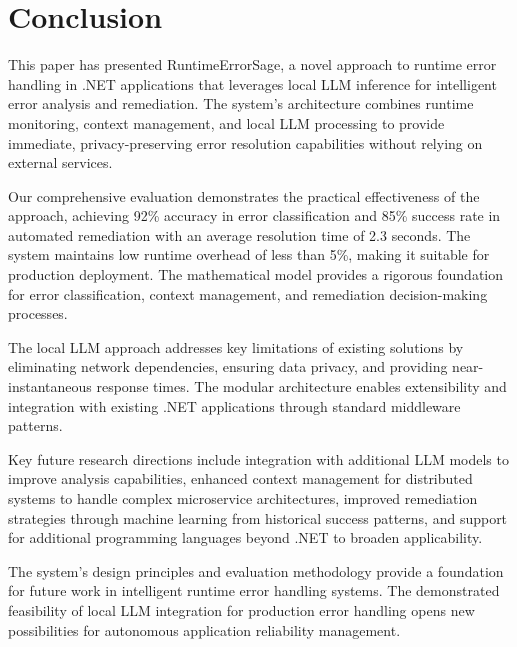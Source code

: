 \section{Conclusion}\label{sec:conclusion}
This paper has presented RuntimeErrorSage, a novel approach to runtime error handling in .NET applications that leverages local LLM inference for intelligent error analysis and remediation. The system's architecture combines runtime monitoring, context management, and local LLM processing to provide immediate, privacy-preserving error resolution capabilities without relying on external services.

Our comprehensive evaluation demonstrates the practical effectiveness of the approach, achieving 92\% accuracy in error classification and 85\% success rate in automated remediation with an average resolution time of 2.3 seconds. The system maintains low runtime overhead of less than 5\%, making it suitable for production deployment. The mathematical model provides a rigorous foundation for error classification, context management, and remediation decision-making processes.

The local LLM approach addresses key limitations of existing solutions by eliminating network dependencies, ensuring data privacy, and providing near-instantaneous response times. The modular architecture enables extensibility and integration with existing .NET applications through standard middleware patterns.

Key future research directions include integration with additional LLM models to improve analysis capabilities, enhanced context management for distributed systems to handle complex microservice architectures, improved remediation strategies through machine learning from historical success patterns, and support for additional programming languages beyond .NET to broaden applicability.

The system's design principles and evaluation methodology provide a foundation for future work in intelligent runtime error handling systems. The demonstrated feasibility of local LLM integration for production error handling opens new possibilities for autonomous application reliability management.